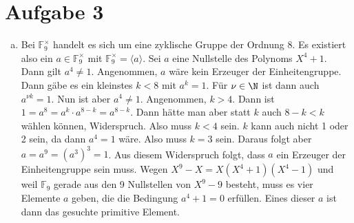 \documentclass{article}
\begin{document}
    \section*{Aufgabe 3}
    \begin{enumerate}[(a)]
        \item Bei $\mathbb{F}_9^\times$ handelt es sich um eine zyklische Gruppe der Ordnung $8$. Es existiert also ein $a\in \mathbb{F}_9^\times$ mit $\mathbb{F}_9^\times = \langle a\rangle$. Sei $a$ eine Nullstelle des Polynoms $X^4 + 1$. Dann gilt $a^4 \neq 1$. Angenommen, $a$ wäre kein Erzeuger der Einheitengruppe. Dann gäbe es ein kleinstes $k < 8$ mit $a^k = 1$. Für $\nu \in \N$ ist dann auch $a^{\nu k} = 1$. Nun ist aber $a^{4} \neq 1$. Angenommen, $k > 4$. Dann ist $1 = a^8 = a^k \cdot a^{8-k} = a^{8-k}$. Dann hätte man aber statt $k$ auch $8-k < k$ wählen können, Widerspruch. Also muss $k < 4$ sein. $k$ kann auch nicht 1 oder 2 sein, da dann $a^4 = 1$ wäre. Also muss $k = 3$ sein. Daraus folgt aber $a = a^9 = (a^3)^3 = 1$. Aus diesem Widerspruch folgt, dass $a$ ein Erzeuger der Einheitengruppe sein muss. Wegen $X^9 -X = X (X^4 + 1)(X^4 -1)$ und weil $\mathbb{F}_9$ gerade aus den 9 Nullstellen von $X^9 - 9$ besteht, muss es vier Elemente $a$ geben, die die Bedingung $a^4 + 1 = 0$ erfüllen. Eines dieser $a$ ist dann das gesuchte primitive Element.
        

\end{enumerate}
\end{document}
